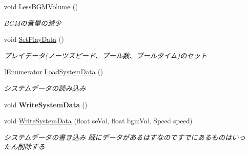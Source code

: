 \begin{DoxyCompactItemize}
void \hyperlink{class_play_data_a74919d0b214b27b6f99f6f12ae45e288}{Less\+B\+G\+M\+Volume} ()
\begin{DoxyCompactList}\small\item\em B\+G\+Mの音量の減少 \end{DoxyCompactList}\item 
void \hyperlink{class_play_data_af321c45a332a001cf564dc34fbf6d200}{Set\+Play\+Data} ()
\begin{DoxyCompactList}\small\item\em プレイデータ(ノーツスピード、プール数、プールタイム)のセット \end{DoxyCompactList}\item 
I\+Enumerator \hyperlink{class_play_data_a7af0781e257708ef6ee6a02eb56984c4}{Load\+System\+Data} ()
\begin{DoxyCompactList}\small\item\em システムデータの読み込み \end{DoxyCompactList}\item 
void {\bfseries Write\+System\+Data} ()\hypertarget{class_play_data_a86f121114610b5e2fe2b580a737aae69}{}\label{class_play_data_a86f121114610b5e2fe2b580a737aae69}

\item 
void \hyperlink{class_play_data_a6bc6a5c0b10fe2b7089b4ee043f42c89}{Write\+System\+Data} (float se\+Vol, float bgm\+Vol, Speed speed)
\begin{DoxyCompactList}\small\item\em システムデータの書き込み 既にデータがあるはずなのですでにあるものはいったん削除する \end{DoxyCompactList}\end{DoxyCompactItemize}
